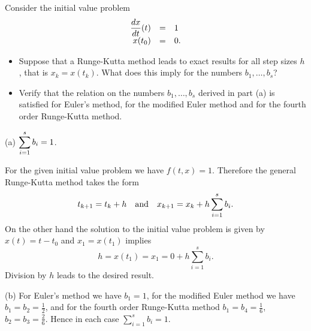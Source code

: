 \documentclass{ximera}
\begin{document}
\begin{exercise} \label{c15.1.4}
Consider the initial value problem
\[
\begin{array}{rcl}
\displaystyle\frac{dx}{dt}(t) & = & 1 \\
x(t_0) & = & 0.
\end{array}
\]
\begin{itemize}
\item[(a)] Suppose that a Runge-Kutta method leads to exact
results for all step sizes $h$, that is $x_k=x(t_k)$.  What 
does this imply for the numbers $b_1,\ldots,b_s$?
\item[(b)] Verify that the relation on the numbers $b_1,\ldots,b_s$
derived in part (a) is satisfied
for Euler's method, for the modified Euler method and for the
fourth order Runge-Kutta method.
\end{itemize}

\begin{solution}

(a) \ans $\displaystyle\sum_{i=1}^s b_i = 1$.

\soln For the given initial value problem we have $f(t,x)=1$.
Therefore the general Runge-Kutta method takes the form
\[
t_{k+1} = t_k + h\quad\mbox{and}\quad x_{k+1} = x_k + h\sum_{i=1}^s b_i.
\]
On the other hand the solution to the initial value problem is
given by $x(t) = t-t_0$ and $x_1=x(t_1)$ implies
\[
h = x(t_1) = x_1 = 0+h\sum_{i=1}^s b_i.
\]
Division by $h$ leads to the desired result.

(b) For Euler's method we have $b_1=1$, for the modified Euler
method we have $b_1=b_2=\frac{1}{2}$, and for the fourth order
Runge-Kutta method $b_1=b_4 = \frac{1}{6}$,
$b_2 = b_3 = \frac{2}{6}$.  Hence in each case $\sum_{i=1}^s b_i=1$.

\end{solution}
\end{exercise}
\end{document}
